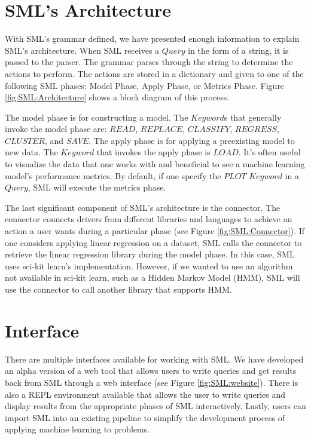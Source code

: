 \section{SML's Architecture}
\label{sml-architecture}

With SML's grammar defined, we have presented enough information to explain SML's architecture.  When SML receives a \(Query\) in the form of a string, it is passed to the parser. The grammar parses through the string to determine the actions to perform.  The actions are stored in a dictionary and given to one of the following SML phases: Model Phase, Apply Phase, or Metrics Phase. Figure \ref{fig:SML:Architecture} shows a block diagram of this process.

The model phase is for constructing a model. The \(Keyword\)s that generally invoke the model phase are: \(READ\), \(REPLACE\), \(CLASSIFY\), \(REGRESS\), \(CLUSTER\), and \(SAVE\). The apply phase is for applying a preexisting model to new data. The \(Keyword\) that invokes the apply phase is \(LOAD\). It's often useful to visualize the data that one works with and beneficial to see a machine learning model's performance metrics. By default, if one specify the \(PLOT\) \(Keyword\) in a \(Query\), SML will execute the metrics phase.

The last significant component of SML's architecture is the connector. The connector connects drivers from different libraries and languages to achieve an action a user wants during a particular phase (see Figure \ref{fig:SML:Connector}). If one considers applying linear regression on a dataset, SML calls the connector to retrieve the linear regression library during the model phase. In this case, SML uses sci-kit learn's implementation. However, if we wanted to use an algorithm not available in sci-kit learn, such as a Hidden Markov Model (HMM), SML will use the connector to call another library that supports HMM.

\section{Interface}
\label{interface}

There are multiple interfaces available for working with SML. We have developed an alpha version of a web tool that allows users to write queries and get results back from SML through a web interface (see Figure \ref{fig:SML:website}). There is also a REPL environment available that allows the user to write queries and display results from the appropriate phases of SML interactively.  Lastly,  users can import SML into an existing pipeline to simplify the development process of applying machine learning to problems.

